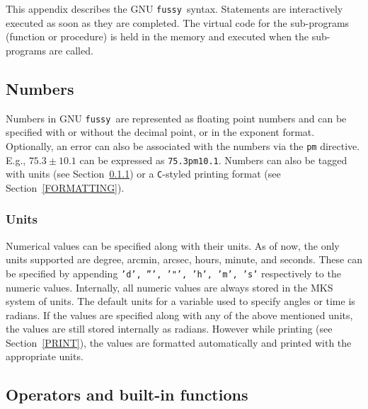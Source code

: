 \documentclass[11pt]{article}
\newcommand{\Fussy}{GNU {\tt fussy}}
\begin{document}
This appendix describes the \Fussy\ syntax.  Statements are
interactively executed as soon as they are completed.  The virtual
code for the sub-programs (function or procedure) is held in the
memory and executed when the sub-programs are called.

\subsection{Numbers}
\label{NUMBERS}
Numbers in \Fussy\ are represented as floating point numbers and can
be specified with or without the decimal point, or in the exponent
format.  Optionally, an error can also be associated with the numbers
via the {\tt pm} directive.  E.g., $75.3\pm 10.1$ can be expressed as
{\tt 75.3pm10.1}.  Numbers can also be tagged with units (see
Section~\ref{UNITS}) or a {\tt C}-styled printing format (see
Section~\ref{FORMATTING}).

\subsubsection{Units}
\label{UNITS}
   
Numerical values can be specified along with their units.  As of now,
the only units supported are degree, arcmin, arcsec, hours, minute,
and seconds.  These can be specified by appending {\tt 'd', ''', '"',
'h', 'm', 's'} respectively to the numeric values.  Internally, all
numeric values are always stored in the MKS system of units.  The
default units for a variable used to specify angles or time is
radians.  If the values are specified along with any of the above
mentioned units, the values are still stored internally as radians.
However while printing (see Section~\ref{PRINT}), the values are
formatted automatically and printed with the appropriate units.

\subsection{Operators and built-in functions}
\end{document}
